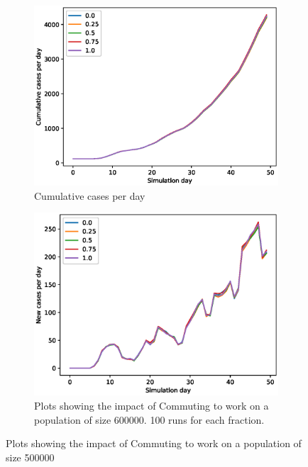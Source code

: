 \documentclass[runningheads]{llncs}
\begin{document}
\begin{figure}[h!]
	\centering
	\begin{subfigure}[b]{0.7\linewidth}
		\includegraphics[width=\textwidth]{work_cum_2.eps}
		\caption{Cumulative cases per day} 
	\end{subfigure}
	\begin{subfigure}[b]{0.7\linewidth}
		\includegraphics[width=\textwidth]{work_cases_per_day_2.eps}
		\caption{Plots showing the impact of Commuting to work on a population of size 600000. 100 runs for each fraction. } 
	\end{subfigure}
	\caption{Plots showing the impact of Commuting to work on a population of size 500000}
	\label{VaccinePlot}
\end{figure}
\end{document}
